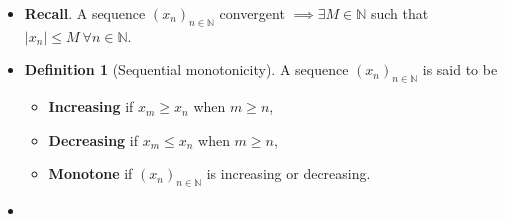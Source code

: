 \documentclass{article}
\newcommand{\R}{\mathbb{R}}
\newcommand{\N}{\mathbb{N}}
\newcommand{\seq}[2]{(#1_{#2})_{#2 \in \N}}
\newcommand{\?}{\stackrel{?}{=}}
\newcommand{\smallblacksquare}{\rule{0.5em}{0.5em}}
\theoremstyle{definition} %
\newtheorem{definition}[subsection]{Definition} %
\begin{document}
\begin{itemize}
\begin{lemma}
              Every convergent sequence is bounded.
          \end{lemma}
          \begin{proof}
              Let $\seq{x}{n}$ be a convergent sequence, that is, there exists some $x \in \R$ such that for all $\varepsilon > 0$, there exists some $N(\varepsilon) \in \N$ and
              $$|x - x_n| \leq \varepsilon \ \forall n \geq N(\varepsilon).$$
              In particular, take for $\varepsilon = 1$, there is $N(1)$ such that
              $$|x_n - x| \leq 1 \ \forall n \geq N(1).$$
              Recall the reverse triangle inequality,
              \begin{alignat*}{2}
                  |x_n| - |x|       & \leq |x - x_n|     &  & \leq 1 \quad n \geq N(1) \\
                  \implies \, |x_n| & \leq 1 + |x| \quad &  & n \geq N(1)
              \end{alignat*}
              Let $M = \max\{|x_0|, |x_1|, \ldots, |x_{N(1) - 1}|, 1 + |x|\}$. Then certainly
              \begin{align*}
                  |x_n|          & \leq M \qquad n \leq N(1)       \\
                  |x_n|          & \leq M \qquad n \geq N(1)       \\
                  \implies |x_n| & \leq M \qquad \forall n \in \N.
              \end{align*}
          \end{proof}
    \item \textbf{Recall}. A sequence $(x_n)_{n \in \N}$ convergent $\implies \exists M \in \N$ such that $|x_n| \leq M \ \forall n \in \N$.
    \item[]
          \begin{definition}[Sequential monotonicity]
              A sequence $\seq{x}{n}$ is said to be
              \begin{itemize}[label=\smallblacksquare]
                  \item \textbf{Increasing} if $x_m \geq x_n$ when $m \geq n$,
                  \item \textbf{Decreasing} if $x_m \leq x_n$ when $m \geq n$,
                  \item \textbf{Monotone} if $\seq{x}{n}$ is increasing or decreasing.
              \end{itemize}
          \end{definition}
    \item[]
          \begin{lemma}

\end{lemma}
\end{itemize}
\end{document}
